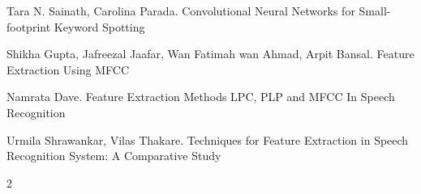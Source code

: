 \documentclass[twoside]{article}
\begin{document}
\begin{multicols}{2}
\begin{thebibliography}{99}

Tara N. Sainath, Carolina Parada.
\newblock Convolutional Neural Networks for Small-footprint Keyword Spotting

Shikha Gupta, Jafreezal Jaafar, Wan Fatimah wan Ahmad, Arpit Bansal.
\newblock Feature Extraction Using MFCC

Namrata Dave.
\newblock Feature Extraction Methods LPC, PLP and MFCC In Speech Recognition

Urmila Shrawankar, Vilas Thakare.
\newblock Techniques for Feature Extraction in Speech Recognition System: A Comparative Study

\end{thebibliography}


\end{multicols}{2}
\end{document}
